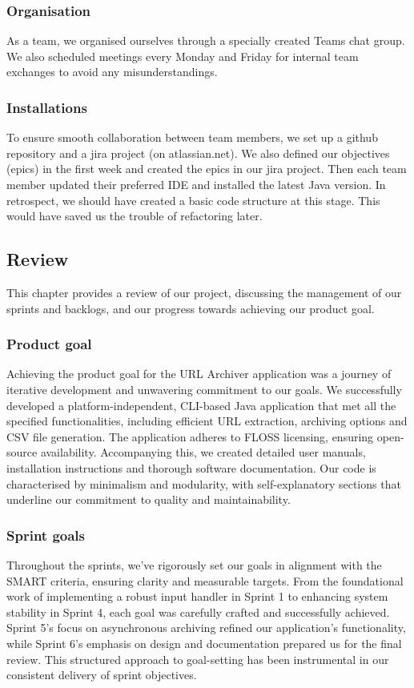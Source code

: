 \subsubsection{Organisation}
As a team, we organised ourselves through a specially created Teams chat group.
We also scheduled meetings every Monday and Friday for internal team exchanges to avoid any misunderstandings.

\subsubsection{Installations}
To ensure smooth collaboration between team members, we set up a github repository and a jira project (on atlassian.net).
We also defined our objectives (epics) in the first week and created the epics in our jira project. 
Then each team member updated their preferred IDE and installed the latest Java version.
In retrospect, we should have created a basic code structure at this stage. This would have saved us the trouble of refactoring later.

\subsection{Review}
This chapter provides a review of our project, discussing the management of our sprints and backlogs, and our progress towards achieving our product goal.

\subsubsection{Product goal}
Achieving the product goal for the URL Archiver application was a journey of iterative development and unwavering commitment to our goals.
We successfully developed a platform-independent, CLI-based Java application that met all the specified functionalities, including efficient URL extraction, archiving options and CSV file generation.
The application adheres to FLOSS licensing, ensuring open-source availability.
Accompanying this, we created detailed user manuals, installation instructions and thorough software documentation.
Our code is characterised by minimalism and modularity, with self-explanatory sections that underline our commitment to quality and maintainability.

\subsubsection{Sprint goals}
Throughout the sprints, we've rigorously set our goals in alignment with the SMART criteria, ensuring clarity and measurable targets.
From the foundational work of implementing a robust input handler in Sprint 1 to enhancing system stability in Sprint 4, each goal was carefully crafted and successfully achieved.
Sprint 5's focus on asynchronous archiving refined our application's functionality, while Sprint 6's emphasis on design and documentation prepared us for the final review.
This structured approach to goal-setting has been instrumental in our consistent delivery of sprint objectives.

